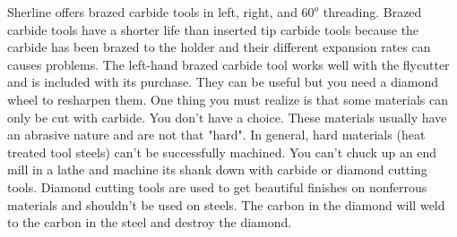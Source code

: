 Sherline offers brazed carbide tools in left, right, and $60^o$ threading.
Brazed carbide tools have a shorter life than inserted tip carbide tools because
the carbide has been brazed to the holder and their different expansion rates
can causes problems. The left-hand brazed carbide tool works well with the
flycutter and is included with its purchase. They can be useful but you need a
diamond wheel to resharpen them. One thing you must realize is that some
materials can only be cut with carbide. You don't have a choice. These materials
usually have an abrasive nature and are not that "hard". In general, hard
materials (heat treated tool steels) can't be successfully machined. You can't
chuck up an end mill in a lathe and machine its shank down with carbide or
diamond cutting tools. Diamond cutting tools are used to get beautiful finishes
on nonferrous materials and shouldn't be used on steels. The carbon in the
diamond will weld to the carbon in the steel and destroy the diamond.

\secup

\secup

